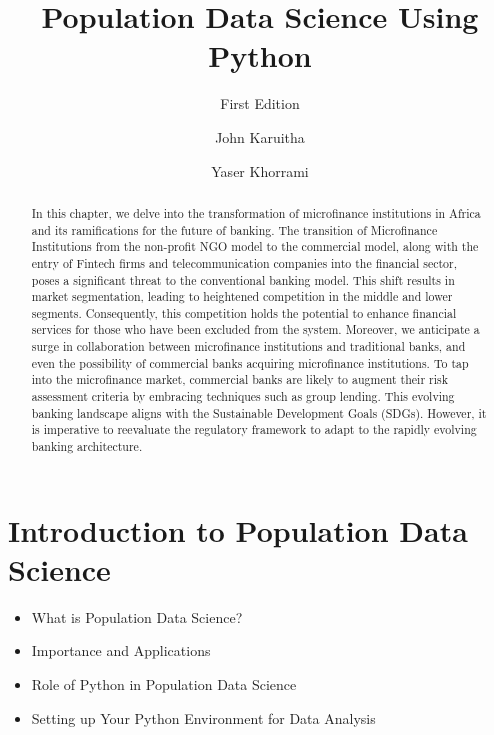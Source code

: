 \documentclass[
]{book}
\title{\textbf{Population Data Science Using Python}}
\subtitle{First Edition}
\author{John Karuitha \and Yaser Khorrami}
\date{}
\providecommand{\tightlist}{%
  \setlength{\itemsep}{0pt}\setlength{\parskip}{0pt}}\usepackage{longtable,booktabs,array}
\renewcommand*\contentsname{Table of contents}
\newcommand\contentsname{Table of contents}
\begin{document}
\frontmatter
\maketitle
\begin{abstract}
In this chapter, we delve into the transformation of microfinance
institutions in Africa and its ramifications for the future of banking.
The transition of Microfinance Institutions from the non-profit NGO
model to the commercial model, along with the entry of Fintech firms and
telecommunication companies into the financial sector, poses a
significant threat to the conventional banking model. This shift results
in market segmentation, leading to heightened competition in the middle
and lower segments. Consequently, this competition holds the potential
to enhance financial services for those who have been excluded from the
system. Moreover, we anticipate a surge in collaboration between
microfinance institutions and traditional banks, and even the
possibility of commercial banks acquiring microfinance institutions. To
tap into the microfinance market, commercial banks are likely to augment
their risk assessment criteria by embracing techniques such as group
lending. This evolving banking landscape aligns with the Sustainable
Development Goals (SDGs). However, it is imperative to reevaluate the
regulatory framework to adapt to the rapidly evolving banking
architecture.
\end{abstract}
\ifdefined\Shaded\renewenvironment{Shaded}{\begin{tcolorbox}[breakable, boxrule=0pt, frame hidden, sharp corners, borderline west={3pt}{0pt}{shadecolor}, interior hidden, enhanced]}{\end{tcolorbox}}\fi

\renewcommand*\contentsname{Contents}
{
\setcounter{tocdepth}{3}
\tableofcontents
}
\mainmatter
\newpage

\hypertarget{introduction-to-population-data-science}{%
\chapter{\texorpdfstring{\textbf{Introduction to Population Data
Science}}{Introduction to Population Data Science}}\label{introduction-to-population-data-science}}

\begin{itemize}
\tightlist
\item
  What is Population Data Science?
\item
  Importance and Applications
\item
  Role of Python in Population Data Science
\item
  Setting up Your Python Environment for Data Analysis
\end{itemize}
\end{document}
